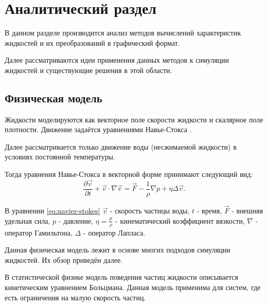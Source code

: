 \chapter{Аналитический раздел}
\label{cha:analysis}
%


В данном разделе производится анализ методов вычислений характеристик жидкостей и
их преобразований в графический формат.

Далее рассматриваются идеи применения данных методов к симуляции жидкостей и существующие решения в этой области.


\section{Физическая модель}

Жидкости моделируются как векторное поле скорости жидкости и скалярное поле
плотности. Движение задаётся уравнениями Навье-Стокса \cite{inbook:bigenc}.

Далее рассматривается только движение воды (несжимаемой жидкости) в условиях постоянной температуры.

Тогда уравнения Навье-Стокса в векторной форме принимают следующий вид:
\begin{equation}
    \label{eq:navier-stokes}
    \frac{\partial \vec{v}}{\partial t} + \vec{v} \cdot \nabla\vec{v}= \vec{F} - \frac{1}{\rho} \nabla p + \eta\Delta\vec{v}.
\end{equation}

В уравнении \ref{eq:navier-stokes} $\vec{v}$ - скорость частицы воды,
                                   $t$ - время,
                                   ${\vec{F}}$ - внешняя удельная сила,
                                   $p$ - давление,
                                   $\eta = \frac{\mu}{\rho}$ - кинематический коэффициент вязкости,
                                   $\nabla$ - оператор Гамильтона,
                                   $\Delta$ - оператор Лапласа.

Данная физическая модель лежит в основе многих подходов симуляции жидкостей\cite{book:ash}. Их
обзор приведён далее.

В статистической физике модель поведения частиц жидкости описывается кинетическим
уравнением Больцмана. Данная модель применима для систем, где
есть ограничения на малую скорость частиц\cite{site:bolzman}.

